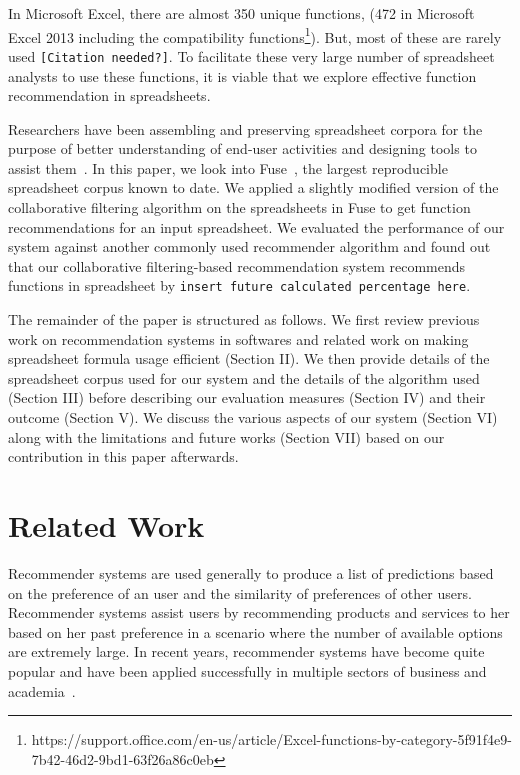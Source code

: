 \documentclass[conference]{IEEEtran}
\begin{document}
In Microsoft Excel, there are almost 350 unique functions, (472 in Microsoft Excel 2013 including the compatibility functions\footnote{https://support.office.com/en-us/article/Excel-functions-by-category-5f91f4e9-7b42-46d2-9bd1-63f26a86c0eb}). But, most of these are rarely used \texttt{[Citation needed?]}. To facilitate these very large number of spreadsheet analysts to use these functions, it is viable that we explore effective function recommendation in spreadsheets.

Researchers have been assembling and preserving spreadsheet corpora for the purpose of better understanding of end-user activities and designing tools to assist them~\cite{fisher2005euses, hermans2014enron}. In this paper, we look into Fuse~\cite{barik2015fuse}, the largest reproducible spreadsheet corpus known to date. We applied a slightly modified version of the collaborative filtering algorithm on the spreadsheets in Fuse to get function recommendations for an input spreadsheet. We evaluated the performance of our system against another commonly used recommender algorithm and found out that our collaborative filtering-based recommendation system recommends functions in spreadsheet by \texttt{insert future calculated percentage here}. 

The remainder of the paper is structured as follows. We first review previous work on recommendation systems in softwares and related work on making spreadsheet formula usage efficient (Section II). We then provide details of the spreadsheet corpus used for our system and the details of the algorithm used (Section III) before describing our evaluation measures (Section IV) and their outcome (Section V). We discuss the various aspects of our system (Section VI) along with the limitations and future works (Section VII) based on our contribution in this paper afterwards.

\section{Related Work}
Recommender systems are used generally to produce a list of predictions based on the preference of an user and the similarity of preferences of other users. Recommender systems assist users by recommending  products and services to her based on her past preference in a scenario where the number of available options are extremely large. In recent years, recommender systems have become quite popular and have been applied successfully in multiple sectors of business and academia~\cite{hill1995recommending, resnick1994grouplens,shardanand1995social}. 
\end{document}
